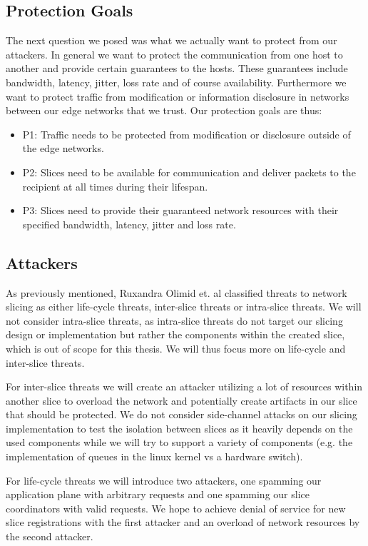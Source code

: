 \documentclass{article}
\begin{document}
\subsection{Protection Goals}
The next question we posed was what we actually want to protect from our attackers. In general we want to protect the communication from one host to another and provide certain guarantees to the hosts. These guarantees include bandwidth, latency, jitter, loss rate and of course availability. Furthermore we want to protect traffic from modification or information disclosure in networks between our edge networks that we trust. Our protection goals are thus:
\begin{itemize}
    \item P1: Traffic needs to be protected from modification or disclosure outside of the edge networks.
    \item P2: Slices need to be available for communication and deliver packets to the recipient at all times during their lifespan.
    \item P3: Slices need to provide their guaranteed network resources with their specified bandwidth, latency, jitter and loss rate.
\end{itemize}

\subsection{Attackers}
As previously mentioned, Ruxandra Olimid et. al \cite{SE2} classified threats to network slicing as either life-cycle threats, inter-slice threats or intra-slice threats. We will not consider intra-slice threats, as intra-slice threats do not target our slicing design or implementation but rather the components within the created slice, which is out of scope for this thesis. We will thus focus more on life-cycle and inter-slice threats.

For inter-slice threats we will create an attacker utilizing a lot of resources within another slice to overload the network and potentially create artifacts in our slice that should be protected. We do not consider side-channel attacks on our slicing implementation to test the isolation between slices as it heavily depends on the used components while we will try to support a variety of components (e.g. the implementation of queues in the linux kernel vs a hardware switch).

For life-cycle threats we will introduce two attackers, one spamming our application plane with arbitrary requests and one spamming our slice coordinators with valid requests. We hope to achieve denial of service for new slice registrations with the first attacker and an overload of network resources by the second attacker.
\end{document}
